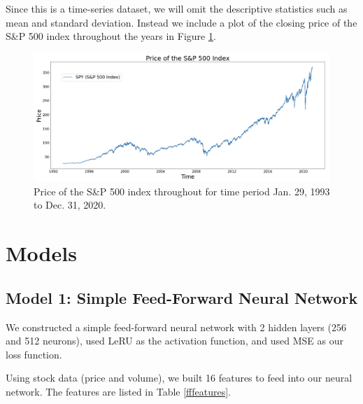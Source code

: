 \documentclass[10pt]{article}
\begin{document}
Since this is a time-series dataset, we will omit the descriptive statistics such as mean and standard deviation. Instead we include a plot of the closing price of the S\&P 500 index throughout the years in Figure \ref{sp500price}.

\begin{figure}[H]
\centering
\includegraphics[width=\textwidth]{sp500price}
\caption{Price of the S\&P 500 index throughout for time period Jan. 29, 1993 to Dec. 31, 2020.}
\label{sp500price}
\end{figure}



\section{Models}

\subsection{Model 1: Simple Feed-Forward Neural Network}

We constructed a simple feed-forward neural network with 2 hidden layers (256 and 512 neurons), used LeRU as the activation function, and used MSE as our loss function.

Using stock data (price and volume), we built 16 features to feed into our neural network. The features are listed in Table \ref{fffeatures}.
\end{document}

